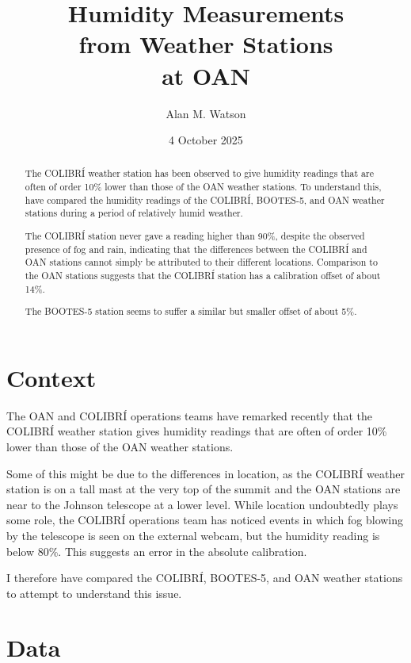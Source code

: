 \documentclass{article}
\title{\bfseries Humidity Measurements\\ from Weather Stations\\ at OAN}
\author{Alan M. Watson}
\date{4 October 2025}
\begin{document}
\maketitle

\begin{abstract}

    \setlength{\parskip}{0.8ex plus 0.3ex}
    \setlength{\parindent}{0ex}
    \noindent

    The COLIBRÍ weather station has been observed to give humidity readings that are often of order 10\% lower than those of the OAN weather stations.  To understand this,  have compared the humidity readings of the COLIBRÍ, BOOTES-5, and OAN weather stations during a period of relatively humid weather.
    
    The COLIBRÍ station never gave a reading higher than 90\%, despite the observed presence of fog and rain, indicating that the differences between the COLIBRÍ and OAN stations cannot simply be attributed to their different locations. Comparison to the OAN stations suggests that the COLIBRÍ station has a calibration offset of about 14\%. 
    
    The BOOTES-5 station seems to suffer a similar but smaller offset of about 5\%.

\end{abstract}

\section{Context}

The OAN and COLIBRÍ operations teams have remarked recently that the COLIBRÍ weather station gives humidity readings that are often of order 10\% lower than those of the OAN weather stations. 

Some of this might be due to the differences in location, as the COLIBRÍ weather station is on a tall mast at the very top of the summit and the OAN stations are near to the Johnson telescope at a lower level. While location undoubtedly plays some role, the COLIBRÍ operations team has noticed events in which fog blowing by the telescope is seen on the external webcam, but the humidity reading is below 80\%. This suggests an error in the absolute calibration.

I therefore have compared the COLIBRÍ, BOOTES-5, and OAN weather stations to attempt to understand this issue.

\section{Data}
\end{document}
